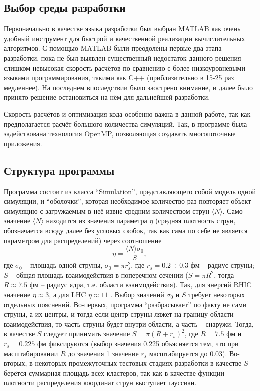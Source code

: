 \subsection{Выбор среды разработки}
Первоначально в качестве языка разработки был выбран MATLAB как очень удобный инструмент для быстрой и качественной реализации вычислительных алгоритмов. С помощью MATLAB были преодолены первые два этапа разработки, пока не был выявлен существенный недостаток данного решения -- слишком невысокая скорость расчётов по сравнению с более низкоуровневыми языками программирования, такими как C++ (приблизительно в 15-25 раз медленнее). На последнем впоследствии было заострено внимание, и далее было принято решение остановиться на нём для дальнейшей разработки. 

Скорость расчётов и оптимизация кода особенно важна в данной работе, так как предполагается расчёт большого количества симуляций. Так, в программе была задействована технология OpenMP, позволяющая создавать многопоточные приложения. 
\subsection{Структура программы}
Программа состоит из класса ``Simulation'', представляющего собой модель одной симуляции, и ``оболочки'', которая необходимое количество раз повторяет объект-симуляцию с загружаемым в неё извне средним количеством струн $\langle N \rangle$. Само значение $\langle N \rangle$ находится из значения параметра $\eta$ (средняя плотность струн, обозначается всюду далее без угловых скобок, так как сама по себе не является параметром для распределений) через соотношение 
\begin{equation} \label{eq:eta}
	\eta = \frac{\langle N \rangle \sigma_0}{S},
\end{equation}
где $\sigma_0$ -- площадь одной струны, $\sigma_0 = \pi r_s^2$, где $r_s = 0.2 \div 0.3$ фм -- радиус струны; $S$ -- общая площадь взаимодействия в поперечном сечении ($S = \pi R^2$, тогда $R \approx 7.5$ фм -- радиус ядра, т.е. области взаимодействия). Так, для энергий RHIC значение $\eta \approx 3$, а для LHC $\eta \approx 11$ \cite{RHICandLHC}. Выбор значений $\sigma_0$ и $S$ требует некоторых отдельных пояснений. Во-первых, программа ``разбрасывает'' по факту не сами струны, а их центры, и тогда если центр струны ляжет на границу области взаимодействия, то часть струны будет внутри области, а часть -- снаружи. Тогда, в качестве $S$ следует принимать значение $S = \pi (R + r_s)^2$, где $R = 7.5$ фм и $r_s = 0.225$ фм фиксируются (выбор значения 0.225 объясняется тем, что при масштабировании $R$ до значения 1 значение $r_s$ масштабируется до 0.03). Во-вторых, в некоторых промежуточных тестовых стадиях разработки в качестве $S$ берётся суммарная площадь всех кластеров, так как в качестве функции плотности распределения координат струн выступает гауссиан.

